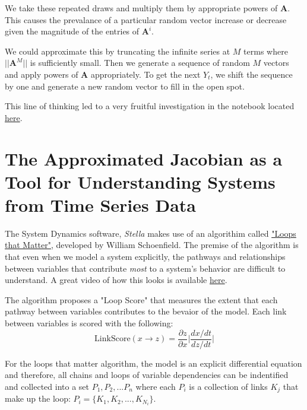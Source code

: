 \documentclass{article}
\begin{document}
        We take these repeated draws and multiply them by appropriate
        powers of $\bm{A}$. This causes the prevalance of a particular
        random vector increase or decrease given the magnitude of the 
        entries of $\bm{A}^i$.

        We could approximate this by truncating the infinite series
        at $M$ terms where $||\bm{A}^M||$ is sufficiently small.
        Then we generate a sequence of random $M$ vectors and apply 
        powers of $\bm{A}$ appropriately. To get the next $Y_t$, we shift
        the sequence by one and generate a new random vector to fill in 
        the open spot.

        This line of thinking led to a very fruitful investigation in
        the notebook located 
        \href{https://github.com/djpasseyjr/graphinference/blob/main/Notebooks/Jupyter/VARAlternateForms.ipynb}{here}.
        
        \section{The Approximated Jacobian as a Tool for Understanding Systems from Time Series Data}

        The System Dynamics software, \textit{Stella} makes use of an algorithim called 
        \href{https://onlinelibrary.wiley.com/doi/full/10.1002/sdr.1658}{"Loops that Matter"},
        developed by William Schoenfield. The premise of the algorithm is that even when we 
        model a system explicitly,
        the pathways and relationships between variables that contribute \textit{most} to
        a system's behavior are difficult to understand. A great video of how
        this looks is available \href{https://youtu.be/DCr68OEWzec?t=612}{here}.

        The algorithm proposes a "Loop Score" that measures the extent
        that each pathway between variables contributes to the bevaior of the model. 
        Each link between variables is scored with the following:
        \[
            \text{LinkScore}(x \rightarrow z) = \frac{\partial z}{\partial x} \Big| \frac{ dx/dt }{ dz/dt } \Big|
        \]

        For the loops that matter algorithm, the model is an explicit differential equation
        and therefore, all chains and loops of variable dependencies can be indentified and
        collected into a set $P_1, P_2, ... P_n$ where each $P_i$ is a collection of links $K_j$ that
        make up the loop: $P_i = \{K_1, K_2, ..., K_{N_i} \}.$
\end{document}
